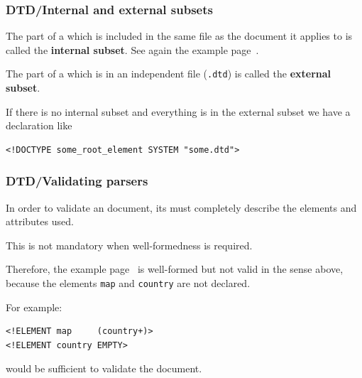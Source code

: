 %
\begin{frame}[containsverbatim]
\frametitle{DTD/Internal and external subsets}

The part of a \DTD which is included in the same file as the \XML
document it applies to is called the \textbf{internal subset}. See
again the example page~\pageref{xml_intro:id_idref}.

\bigskip

The part of a \DTD which is in an independent file (\texttt{.dtd}) is
called the \textbf{external subset}.

\bigskip

If there is no internal subset and everything is in the external
subset we have a declaration like
\begin{verbatim}
<!DOCTYPE some_root_element SYSTEM "some.dtd">
\end{verbatim}

\end{frame}

%
\begin{frame}[containsverbatim]
\frametitle{DTD/Validating parsers}

In order to validate an \XML document, its \DTD must completely
describe the elements and attributes used.

\bigskip

This is not mandatory when well-formedness is required.

\bigskip

Therefore, the example page~\pageref{xml_intro:id_idref} is
well-formed but not valid in the sense above, because the elements
\texttt{map} and \texttt{country} are not declared.

\bigskip

For example:
\begin{verbatim}
<!ELEMENT map     (country+)>
<!ELEMENT country EMPTY>
\end{verbatim}
would be sufficient to validate the document.

\end{frame}
